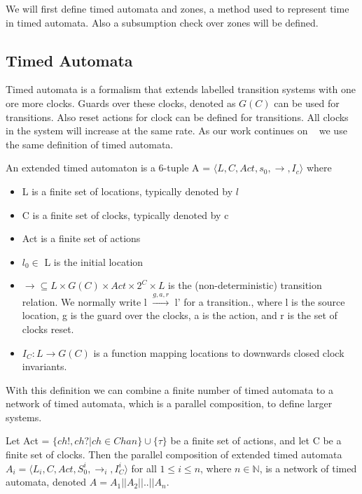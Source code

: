 We will first define timed automata and zones, a method used to represent time in timed automata. Also a subsumption check over zones will be defined. 

\subsection{Timed Automata}
Timed automata is a formalism that extends labelled transition systems with one ore more clocks. Guards over these clocks, denoted as $G(C)$ can be used for transitions. Also reset actions for clock can be defined for transitions. All clocks in the system will increase at the same rate. As our work continues on ~\cite{eemcs21972} we use the same definition of timed automata.

\begin{mydef}
\label{def:TA}
An extended timed automaton is a 6-tuple A = $\langle L, C, Act, s_0, \rightarrow, I_c\rangle$ where
{\renewcommand\labelitemi{--}
	\begin{itemize}
		\item L is a finite set of locations, typically denoted by $l$
		\item C is a finite set of clocks, typically denoted by c
		\item Act is a finite set of actions
		\item $l_0 \in$ L is the initial location
		\item $\rightarrow \subseteq L \times G(C) \times Act \times 2^C \times L$ is the (non-deterministic) transition relation. We normally write l $\stackrel{g,a,r}{\longrightarrow}$ l' for a transition., where l is the source location, g is the guard over the clocks, a is the action, and r is the set of clocks reset.
		\item $I_C : L \rightarrow G(C)$ is a function mapping locations to downwards closed clock invariants.
	\end{itemize}
}
\end{mydef}

With this definition we can combine a finite number of timed automata to a network of timed automata, which is a parallel composition, to define larger systems.

\begin{mydef}
\label{def:networkTA}
Let Act = $\{ch!,ch?|ch \in Chan\} \cup \{\tau\}$ be a finite set of actions, and let C be a finite set of clocks. Then the parallel composition of extended timed automata $A_i = \langle L_i, C, Act, S^i_0, \rightarrow_{i}, I^i_C\rangle$ for all $1 \leq i \leq n$, where $n \in \mathbb{N}$, is a network of timed automata, denoted $A = A_1||A_2||..||A_n$.
\end{mydef}

